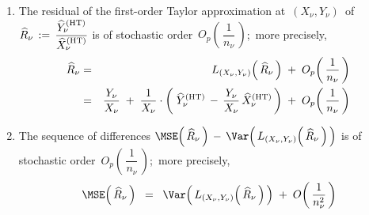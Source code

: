 \begin{theorem}
\begin{enumerate}
\begin{eqnarray*}
    \\
    & = &
        \dfrac{ Y_{\nu} }{ X_{\nu} }
        \; + \;
        \dfrac{1}{X_{\nu}}
        \cdot
        \left(\;
            \widehat{Y}^{\textnormal{(HT)}}_{\nu}
            \,-\,
            \dfrac{ Y_{\nu} }{ X_{\nu} }
            \,
            \widehat{X}^{\textnormal{(HT)}}_{\nu}
            \,\right)
    \end{eqnarray*}
\item
    The residual of the first-order Taylor approximation at
    \,$(X_{\nu},Y_{\nu})$\,
    of
    \;$
    \widehat{R}_{\nu}
    \, := \,
        \dfrac{
            \widehat{Y}^{\textnormal{(HT)}}_{\nu}
            }{
            \widehat{X}^{\textnormal{(HT)}}_{\nu}
            }
    $\;
    is of stochastic order
    \,$O_{p}\!\left(\,\dfrac{1}{n_{\nu}}\,\right)$;\,
    more precisely,
    \begin{eqnarray*}
    \widehat{R}_{\nu}
    & = &
        L_{(X_{\nu},Y_{\nu})}\!\left(\,\widehat{R}_{\nu}\,\right)
        \; + \;
        O_{p}\!\left(\,\dfrac{1}{n_{\nu}}\,\right)
    \\
    & = &
        \dfrac{ Y_{\nu} }{ X_{\nu} }
        \; + \;
        \dfrac{1}{X_{\nu}}
        \cdot
        \left(\;
            \widehat{Y}^{\textnormal{(HT)}}_{\nu}
            \,-\,
            \dfrac{ Y_{\nu} }{ X_{\nu} }
            \,
            \widehat{X}^{\textnormal{(HT)}}_{\nu}
            \,\right)
        \; + \;
        O_{p}\!\left(\,\dfrac{1}{n_{\nu}}\,\right)
    \end{eqnarray*}
\item
    The sequence of differences
    \;$
    \MSE\!\left(\,\widehat{R}_{\nu}\,\right)
    \,-\,
    \Var\!\left(\,L_{(X_{\nu},Y_{\nu})}\!\left(\,\widehat{R}_{\nu}\,\right)\,\right)
    $\;
    is of stochastic order
    \,$O_{p}\!\left(\,\dfrac{1}{n_{\nu}}\,\right)$;\,
    more precisely,
    \begin{equation*}
    \MSE\!\left(\,\widehat{R}_{\nu}\,\right)
    \;\; = \;\;
        \Var\!\left(\,L_{(X_{\nu},Y_{\nu})}\!\left(\,\widehat{R}_{\nu}\,\right)\,\right)
        \; + \;
        O\!\left(\,\dfrac{1}{n_{\nu}^{2}}\,\right)
    \end{equation*}
\end{enumerate}
\end{theorem}

